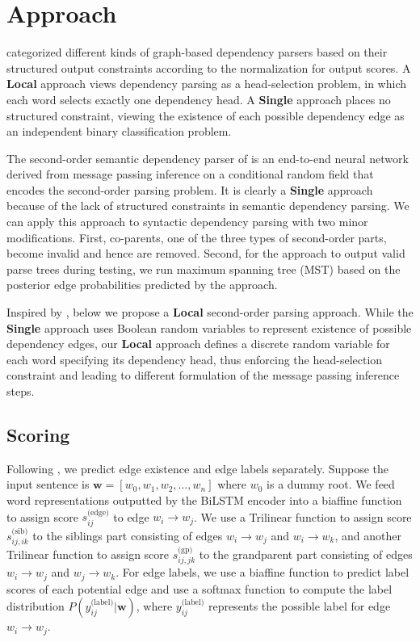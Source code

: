 \documentclass[11pt,a4paper]{article}
\newcommand{\wvec}{\mathbf{w}}
\begin{document}
\section{Approach}
\citet{zhang-etal-2019-empirical} categorized different kinds of graph-based dependency parsers based on their structured output constraints according to the normalization for output scores. A \textbf{Local} approach views dependency parsing as a head-selection problem, in which each word selects exactly one dependency head. A \textbf{Single} approach places no structured constraint, viewing the existence of each possible dependency edge as an independent binary classification problem. 

The second-order semantic dependency parser of \citet{wang-etal-2019-second} is an end-to-end neural network derived from message passing inference on a conditional random field that encodes the second-order parsing problem. It is clearly a \textbf{Single} approach because of the lack of structured constraints in semantic dependency parsing. We can apply this approach to syntactic dependency parsing with two minor modifications. First, co-parents, one of the three types of second-order parts, become invalid and hence are removed. Second, for the approach to output valid parse trees during testing, we run maximum spanning tree (MST) \cite{mcdonald-etal-2005-non} based on the posterior edge probabilities predicted by the approach. 

Inspired by \citet{wang-etal-2019-second}, below we propose a \textbf{Local} second-order parsing approach.
While the \textbf{Single} approach uses Boolean random variables to represent existence of possible dependency edges, our \textbf{Local} approach defines a discrete random variable for each word specifying its dependency head, thus enforcing the head-selection constraint and leading to different formulation of the message passing inference steps.

\subsection{Scoring}
Following \citet{dozat2016deep}, we predict edge existence and edge labels separately. Suppose the input sentence is $\mathbf{w}=[w_0, w_1,w_2,\dots,w_n]$ where $w_0$ is a dummy root. We feed word representations outputted by the BiLSTM encoder into a biaffine function to assign score $s_{ij}^{\textrm{(edge)}}$ to edge $w_i \rightarrow w_j$. We use a Trilinear function to assign score $s_{ij,ik}^{\textrm{(sib)}}$ to the siblings part consisting of edges $w_i \rightarrow w_j$ and $w_i \rightarrow w_k$, and another Trilinear function to assign score $s_{ij,jk}^{\textrm{(gp)}}$ to the grandparent part consisting of edges $w_i \rightarrow w_j$ and $w_j \rightarrow w_k$. For edge labels, we use a biaffine function to predict label scores of each potential edge and use a softmax function to compute the label distribution $P(y_{ij}^{\text{(label)}}|\wvec)$, where $y_{ij}^{\text{(label)}}$ represents the possible label for edge $w_i \rightarrow w_j$.
\end{document}
